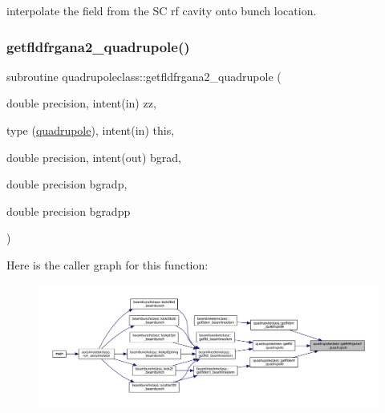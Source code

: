 interpolate the field from the SC rf cavity onto bunch location. 

\mbox{\label{namespacequadrupoleclass_ab1abe8916ad3dace3e5d1373da4688ac}} 
\subsubsection{\texorpdfstring{getfldfrgana2\_quadrupole()}{getfldfrgana2\_quadrupole()}}
{\footnotesize\ttfamily subroutine quadrupoleclass\+::getfldfrgana2\+\_\+quadrupole (\begin{DoxyParamCaption}\item[{double precision, intent(in)}]{zz,  }\item[{type (\mbox{\hyperlink{namespacequadrupoleclass_structquadrupoleclass_1_1quadrupole}{quadrupole}}), intent(in)}]{this,  }\item[{double precision, intent(out)}]{bgrad,  }\item[{double precision}]{bgradp,  }\item[{double precision}]{bgradpp }\end{DoxyParamCaption})}

Here is the caller graph for this function\+:\nopagebreak
\begin{figure}[H]
\begin{center}
\leavevmode
\includegraphics[width=350pt]{namespacequadrupoleclass_ab1abe8916ad3dace3e5d1373da4688ac_icgraph}
\end{center}
\end{figure}
\mbox{\label{namespacequadrupoleclass_aac2c756ddd587ca842555670b0ad16b3}} 
